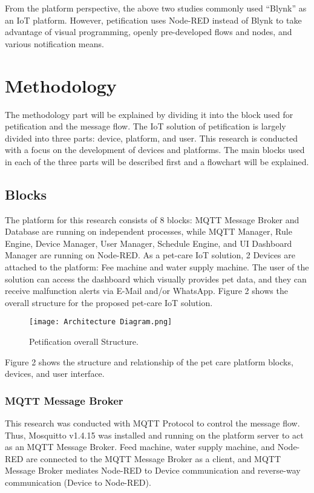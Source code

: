 \documentclass[conference]{IEEEtran}
\begin{document}
From the platform perspective, the above two studies commonly used “Blynk” as an IoT platform. However, petification uses Node-RED instead of Blynk to take advantage of visual programming, openly pre-developed flows and nodes, and various notification means.

\section{Methodology}
The methodology part will be explained by dividing it into the block used for petification and the message flow. The IoT solution of petification is largely divided into three parts: device, platform, and user. This research is conducted with a focus on the development of devices and platforms. The main blocks used in each of the three parts will be described first and a flowchart will be explained.

\subsection{Blocks}
The platform for this research consists of 8 blocks: MQTT Message Broker and Database are running on independent processes, while MQTT Manager, Rule Engine, Device Manager, User Manager, Schedule Engine, and UI Dashboard Manager are running on Node-RED. As a pet-care IoT solution, 2 Devices are attached to the platform: Fee machine and water supply machine. The user of the solution can access the dashboard which visually provides pet data, and they can receive malfunction alerts via E-Mail and/or WhatsApp. Figure 2 shows the overall structure for the proposed pet-care IoT solution.
\begin{figure}[htbp]

\centerline{\texttt{[image: Architecture Diagram.png]}}
\caption{Petification overall Structure.}
\label{fig}
\end{figure}

Figure 2 shows the structure and relationship of the pet care platform blocks, devices, and user interface.
\subsubsection{MQTT Message Broker}
\hfill \break This research was conducted with MQTT Protocol to control the message flow. Thus, Mosquitto v1.4.15 was installed and running on the platform server to act as an MQTT Message Broker. Feed machine, water supply machine, and Node-RED are connected to the MQTT Message Broker as a client, and MQTT Message Broker mediates Node-RED to Device communication and reverse-way communication (Device to Node-RED).
\end{document}
